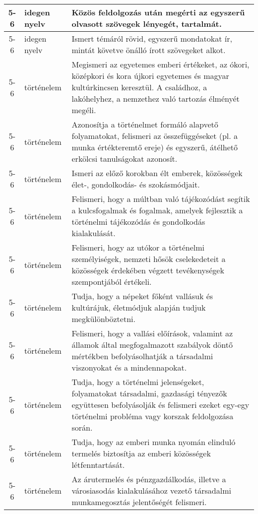 \begin{small}
\begin{longtable}{c | p{2cm} |  p{11cm} }
              5-6 & idegen nyelv & Közös feldolgozás után megérti az egyszerű olvasott szövegek lényegét, tartalmát. \\ \hline
              5-6 & idegen nyelv & Ismert témáról rövid, egyszerű mondatokat ír, mintát követve önálló írott szövegeket alkot. \\ \hline
              5-6 & történelem & Megismeri az egyetemes emberi értékeket, az ókori, középkori és kora újkori egyetemes és magyar kultúrkincsen keresztül. A családhoz, a lakóhelyhez, a nemzethez való tartozás élményét megéli. \\ \hline
              5-6 & történelem & Azonosítja a történelmet formáló alapvető folyamatokat, felismeri az összefüggéseket (pl. a munka értékteremtő ereje) és egyszerű, átélhető erkölcsi tanulságokat azonosít. \\ \hline
              5-6 & történelem & Ismeri az előző korokban élt emberek, közösségek élet-, gondolkodás- és szokásmódjait. \\ \hline
              5-6 & történelem & Felismeri, hogy a múltban való tájékozódást segítik a kulcsfogalmak és fogalmak, amelyek fejlesztik a történelmi tájékozódás és gondolkodás kialakulását. \\ \hline
              5-6 & történelem & Felismeri, hogy az utókor a történelmi személyiségek, nemzeti hősök cselekedeteit a közösségek érdekében végzett tevékenységek szempontjából értékeli. \\ \hline
              5-6 & történelem & Tudja, hogy a népeket főként vallásuk és kultúrájuk, életmódjuk alapján tudjuk megkülönböztetni. \\ \hline
              5-6 & történelem & Felismeri, hogy a vallási előírások, valamint az államok által megfogalmazott szabályok döntő mértékben befolyásolhatják a társadalmi viszonyokat és a mindennapokat. \\ \hline
              5-6 & történelem & Tudja, hogy a történelmi jelenségeket, folyamatokat társadalmi, gazdasági tényezők együttesen befolyásolják és felismeri ezeket egy-egy történelmi probléma vagy korszak feldolgozása során. \\ \hline
              5-6 & történelem & Tudja, hogy az emberi munka nyomán elinduló termelés biztosítja az emberi közösségek létfenntartását. \\ \hline
              5-6 & történelem & Az árutermelés és pénzgazdálkodás, illetve a városiasodás kialakulásához vezető társadalmi munkamegosztás jelentőségét felismeri. \\ \hline

\end{longtable}
\end{small}
